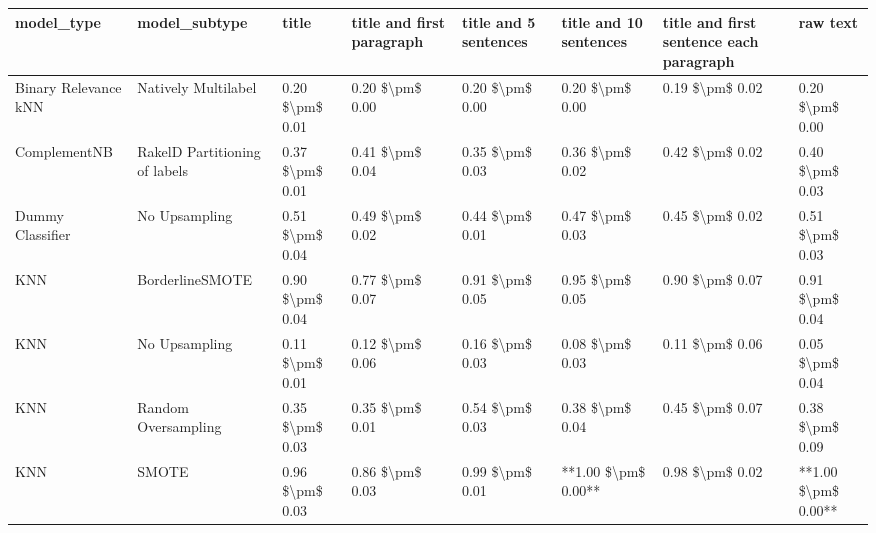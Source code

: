 \begin{tabular}{llllllll}
\toprule
                     model\_type &                 model\_subtype &           title & title and first paragraph & title and 5 sentences & title and 10 sentences & title and first sentence each paragraph &            raw text \\
\midrule
           Binary Relevance kNN &           Natively Multilabel & 0.20 \$\textbackslash pm\$ 0.01 &           0.20 \$\textbackslash pm\$ 0.00 &       0.20 \$\textbackslash pm\$ 0.00 &        0.20 \$\textbackslash pm\$ 0.00 &                         0.19 \$\textbackslash pm\$ 0.02 &     0.20 \$\textbackslash pm\$ 0.00 \\
                   ComplementNB & RakelD Partitioning of labels & 0.37 \$\textbackslash pm\$ 0.01 &           0.41 \$\textbackslash pm\$ 0.04 &       0.35 \$\textbackslash pm\$ 0.03 &        0.36 \$\textbackslash pm\$ 0.02 &                         0.42 \$\textbackslash pm\$ 0.02 &     0.40 \$\textbackslash pm\$ 0.03 \\
               Dummy Classifier &                 No Upsampling & 0.51 \$\textbackslash pm\$ 0.04 &           0.49 \$\textbackslash pm\$ 0.02 &       0.44 \$\textbackslash pm\$ 0.01 &        0.47 \$\textbackslash pm\$ 0.03 &                         0.45 \$\textbackslash pm\$ 0.02 &     0.51 \$\textbackslash pm\$ 0.03 \\
                            KNN &               BorderlineSMOTE & 0.90 \$\textbackslash pm\$ 0.04 &           0.77 \$\textbackslash pm\$ 0.07 &       0.91 \$\textbackslash pm\$ 0.05 &        0.95 \$\textbackslash pm\$ 0.05 &                         0.90 \$\textbackslash pm\$ 0.07 &     0.91 \$\textbackslash pm\$ 0.04 \\
                            KNN &                 No Upsampling & 0.11 \$\textbackslash pm\$ 0.01 &           0.12 \$\textbackslash pm\$ 0.06 &       0.16 \$\textbackslash pm\$ 0.03 &        0.08 \$\textbackslash pm\$ 0.03 &                         0.11 \$\textbackslash pm\$ 0.06 &     0.05 \$\textbackslash pm\$ 0.04 \\
                            KNN &           Random Oversampling & 0.35 \$\textbackslash pm\$ 0.03 &           0.35 \$\textbackslash pm\$ 0.01 &       0.54 \$\textbackslash pm\$ 0.03 &        0.38 \$\textbackslash pm\$ 0.04 &                         0.45 \$\textbackslash pm\$ 0.07 &     0.38 \$\textbackslash pm\$ 0.09 \\
                            KNN &                         SMOTE & 0.96 \$\textbackslash pm\$ 0.03 &           0.86 \$\textbackslash pm\$ 0.03 &       0.99 \$\textbackslash pm\$ 0.01 &    **1.00 \$\textbackslash pm\$ 0.00** &                         0.98 \$\textbackslash pm\$ 0.02 & **1.00 \$\textbackslash pm\$ 0.00** \\

\end{tabular}
